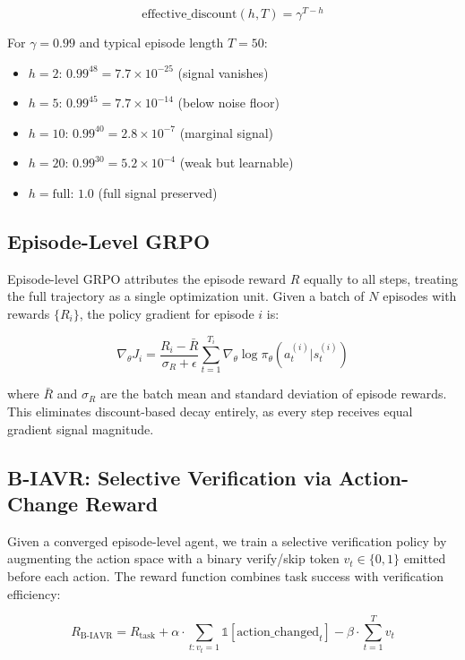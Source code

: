 \documentclass{article}
\begin{document}
\begin{equation}
\text{effective\_discount}(h, T) = \gamma^{T-h}
\end{equation}

For $\gamma = 0.99$ and typical episode length $T = 50$:
\begin{itemize}
\item $h = 2$: $0.99^{48} = 7.7 \times 10^{-25}$ (signal vanishes)
\item $h = 5$: $0.99^{45} = 7.7 \times 10^{-14}$ (below noise floor)
\item $h = 10$: $0.99^{40} = 2.8 \times 10^{-7}$ (marginal signal)
\item $h = 20$: $0.99^{30} = 5.2 \times 10^{-4}$ (weak but learnable)
\item $h = \text{full}$: $1.0$ (full signal preserved)
\end{itemize}

\subsection{Episode-Level GRPO}

Episode-level GRPO attributes the episode reward $R$ equally to all steps, treating the full trajectory as a single optimization unit. Given a batch of $N$ episodes with rewards $\{R_i\}$, the policy gradient for episode $i$ is:

\begin{equation}
\nabla_\theta J_i = \frac{R_i - \bar{R}}{\sigma_R + \epsilon} \sum_{t=1}^{T_i} \nabla_\theta \log \pi_\theta(a_t^{(i)} | s_t^{(i)})
\end{equation}

where $\bar{R}$ and $\sigma_R$ are the batch mean and standard deviation of episode rewards. This eliminates discount-based decay entirely, as every step receives equal gradient signal magnitude.

\subsection{B-IAVR: Selective Verification via Action-Change Reward}

Given a converged episode-level agent, we train a selective verification policy by augmenting the action space with a binary verify/skip token $v_t \in \{0, 1\}$ emitted before each action. The reward function combines task success with verification efficiency:

\begin{equation}
R_{\text{B-IAVR}} = R_{\text{task}} + \alpha \cdot \sum_{t: v_t=1} \mathbb{1}[\text{action\_changed}_t] - \beta \cdot \sum_{t=1}^{T} v_t
\end{equation}
\end{document}
